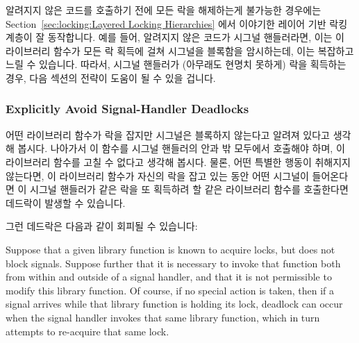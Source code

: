 알려지지 않은 코드를 호출하기 전에 모든 락을 해제하는게 불가능한 경우에는
Section~\ref{sec:locking:Layered Locking Hierarchies} 에서 이야기한 레이어 기반
락킹 계층이 잘 동작합니다.
예를 들어, 알려지지 않은 코드가 시그널 핸들러라면, 이는 이 라이브러리 함수가
모든 락 획득에 걸쳐 시그널을 블록함을 암시하는데, 이는 복잡하고 느릴 수
있습니다.
따라서, 시그널 핸들러가 (아무래도 현명치 못하게) 락을 획득하는 경우, 다음
섹션의 전략이 도움이 될 수 있을 겁니다.

\subsubsection{Explicitly Avoid Signal-Handler Deadlocks}
\label{sec:locking:Explicitly Avoid Signal-Handler Deadlocks}

어떤 라이브러리 함수가 락을 잡지만 시그널은 블록하지 않는다고 알려져 있다고
생각해 봅시다.
나아가서 이 함수를 시그널 핸들러의 안과 밖 모두에서 호출해야 하며, 이
라이브러리 함수를 고칠 수 없다고 생각해 봅시다.
물론, 어떤 특별한 행동이 취해지지 않는다면, 이 라이브러리 함수가 자신의 락을
잡고 있는 동안 어떤 시그널이 들어온다면 이 시그널 핸들러가 같은 락을 또
획득하려 할 같은 라이브러리 함수를 호출한다면 데드락이 발생할 수 있습니다.

그런 데드락은 다음과 같이 회피될 수 있습니다:

\iffalse

Suppose that a given library function is known to acquire locks,
but does not block signals.
Suppose further that it is necessary to invoke that function both from
within and outside of a signal handler, and that it is not permissible
to modify this library function.
Of course, if no special action is taken, then if a signal arrives
while that library function is holding its lock, deadlock can occur
when the signal handler invokes that same library function,
which in turn attempts to re-acquire that same lock.

